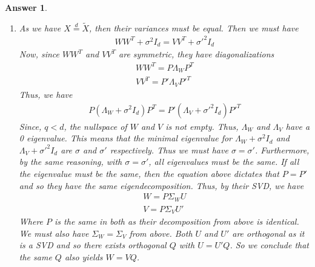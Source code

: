 \documentclass[12pt]{article}
\theoremstyle{colon}
\newtheorem*{answer}{Answer}
\begin{document}
\begin{answer}
\begin{enumerate}[label=\arabic*)]
    \item As we have $X \stackrel{d}{=} \tilde{X}$, then their variances must be equal. Then we must have
      \begin{gather*}
        W W^T + \sigma^2 I_d = V V^T + \sigma'^2 I_d
      \end{gather*}
      Now, since $W W^T$ and $V V^T$ are symmetric, they have diagonalizations
      \begin{gather*}
        W W^T = P \Lambda_W P^T \\
        V V^T = P' \Lambda_V P'^T
      \end{gather*}
      Thus, we have
      \begin{gather*}
        P (\Lambda_W + \sigma^2 I_d) P^T = P' (\Lambda_V + \sigma'^2 I_d) P'^T
      \end{gather*}
      Since, $q < d$, the nullspace of $W$ and $V$ is not empty. Thus, $\Lambda_W$ and $\Lambda_V$ have a 0 eigenvalue. This means that the minimal eigenvalue for $\Lambda_W + \sigma^2 I_d$ and $\Lambda_V + \sigma'^2 I_d$ are $\sigma$ and $\sigma'$ respectively. Thus we must have $\sigma = \sigma'$. Furthermore, by the same reasoning, with $\sigma = \sigma'$, all eigenvalues must be the same. If all the eigenvalue must be the same, then the equation above dictates that $P = P'$ and so they have the same eigendecomposition. Thus, by their SVD, we have
      \begin{gather*}
        W = P \Sigma_W  U \\
        V = P \Sigma_V U'
      \end{gather*}
      Where $P$ is the same in both as their decomposition from above is identical. We must also have $\Sigma_W = \Sigma_V$ from above. Both $U$ and $U'$ are orthogonal as it is a SVD and so there exists orthogonal $Q$ with $U = U' Q$. So we conclude that the same $Q$ also yields $W = VQ$.


\end{enumerate}
\end{answer}
\end{document}
